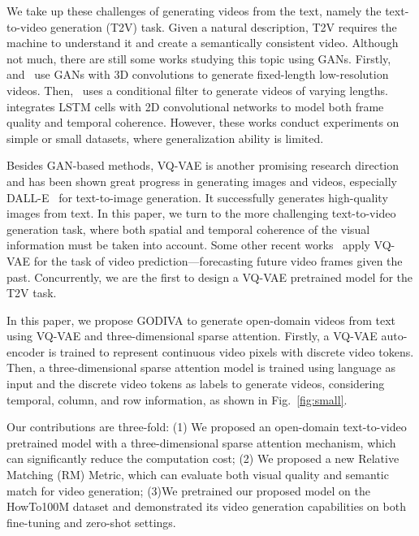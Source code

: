 \documentclass{article}
\begin{document}
We take up these challenges of generating videos from the text, namely the text-to-video generation (T2V) task. Given a natural description, T2V requires the machine to understand it and create a semantically consistent video. Although not much, there are still some works studying this topic using GANs. Firstly,~\cite{liVideoGenerationText2018} and~\cite{panCreateWhatYou2017} use GANs with 3D convolutions to generate fixed-length low-resolution videos. Then,~\cite{balajiConditionalGANDiscriminative2019} uses a conditional filter to generate videos of varying lengths.~\cite{dengIRCGANIntrospectiveRecurrent2019} integrates LSTM cells with 2D convolutional networks to model both frame quality and temporal coherence. However, these works conduct experiments on simple or small datasets, where generalization ability is limited. 

Besides GAN-based methods, VQ-VAE is another promising research direction and has been shown great progress in generating images and videos, especially DALL-E~\cite{rameshZeroShotTexttoImageGeneration2021} for text-to-image generation. It successfully generates high-quality images from text. In this paper, we turn to the more challenging text-to-video generation task, where both spatial and temporal coherence of the visual information must be taken into account. Some other recent works~\cite{rakhimovLatentVideoTransformer2020,walkerPredictingVideoVQVAE2021,zhangVideoGenGenerativeModeling2020} apply VQ-VAE for the task of video prediction—forecasting future video frames given the past. Concurrently, we are the first to design a VQ-VAE pretrained model for the T2V task.  


In this paper, we propose GODIVA to generate open-domain videos from text using VQ-VAE and three-dimensional sparse attention. Firstly, a VQ-VAE auto-encoder is trained to represent continuous video pixels with discrete video tokens. Then, a three-dimensional sparse attention model is trained using language as input and the discrete video tokens as labels to generate videos, considering temporal, column, and row information, as shown in Fig.~\ref{fig:small}.

Our contributions are three-fold: (1) We proposed an open-domain text-to-video pretrained model with a three-dimensional sparse attention mechanism, which can significantly reduce the computation cost; (2) We proposed a new Relative Matching (RM) Metric, which can evaluate both visual quality and semantic match for video generation; (3)We pretrained our proposed model on the HowTo100M dataset and demonstrated its video generation capabilities on both fine-tuning and zero-shot settings.
\end{document}

